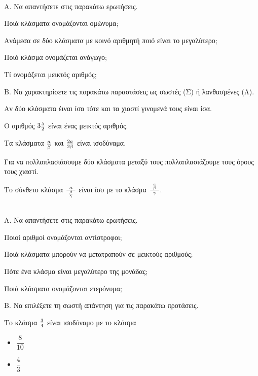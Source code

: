 \documentclass[ektypwsh]{diag-xelatex}
\DeclareRobustCommand{\frac}[3][0pt]{%
{\begingroup\hspace{#1}#2\hspace{#1}\endgroup\over\hspace{#1}#3\hspace{#1}}}
\begin{document}
\thewria
\begin{thema}
\item \mbox{}\\
A. Να απαντήσετε στις παρακάτω ερωτήσεις.
\begin{rlist}
\item Ποιά κλάσματα ονομάζονται ομώνυμα;
\item Ανάμεσα σε δύο κλάσματα με κοινό αριθμητή ποιό είναι το μεγαλύτερο;
\item Ποιό κλάσμα ονομάζεται ανάγωγο;
\item Τί ονομάζεται μεικτός αριθμός;
\end{rlist}
B. Να χαρακτηρίσετε τις παρακάτω παραστάσεις ως σωστές (Σ) ή λανθασμένες (Λ).
\begin{rlist}
\item Αν δύο κλάσματα έιναι ίσα τότε και τα χιαστί γινομενά τους είναι ίσα.
\item Ο αριθμός $ 3\frac{5}{2} $ είναι ένας μεικτός αριθμός.
\item Τα κλάσματα $ \frac{a}{\beta} $ και $ \frac{2a}{2\beta} $ είναι ισοδύναμα.
\item Για να πολλαπλασιάσουμε δύο κλάσματα μεταξύ τους πολλαπλασιάζουμε τους όρους τους χιαστί.
\item Το σύνθετο κλάσμα $ \frac[1mm]{a}{\frac{\beta}{\gamma}} $ είναι ίσο με το κλάσμα $ \frac[1mm]{\frac{a}{\beta}}{\gamma} $.
\end{rlist}
\item \mbox{}\\
Α. Να απαντήσετε στις παρακάτω ερωτήσεις.
\begin{rlist}
\item Ποιοί αριθμοί ονομάζονται αντίστροφοι;
\item Ποιά κλάσματα μπορούν να μετατραπούν σε μεικτούς αριθμούς;
\item Πότε ένα κλάσμα είναι μεγαλύτερο της μονάδας;
\item Ποιά κλάσματα ονομάζονται ετερόνυμα;
\end{rlist}
Β. Να επιλέξετε τη σωστή απάντηση για τις παρακάτω προτάσεις.
\begin{rlist}
\item Το κλάσμα $ \frac{3}{4} $ είναι ισοδύναμο με το κλάσμα
\begin{multicols}{4}
\begin{itemize}
\item $ \dfrac{8}{10} $
\item $ \dfrac{4}{3} $

\end{itemize}
\end{multicols}
\end{rlist}
\end{thema}
\end{document}
